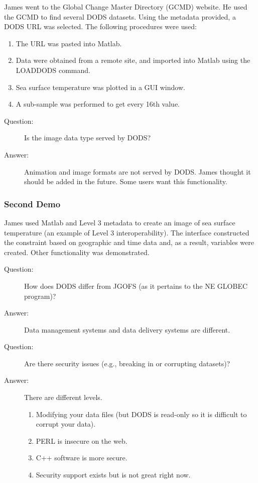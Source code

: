 James went to the Global Change Master Directory (GCMD) website.  He used the 
GCMD to find several DODS datasets.  Using the metadata provided, a DODS URL was 
selected.  The following procedures were used:

\begin{enumerate}
\item The URL was pasted into Matlab.
\item Data were obtained from a remote site, and imported into Matlab
  using the LOADDODS command.
\item Sea surface temperature was plotted in a GUI window.
\item A sub-sample was performed to get every 16th value.
\end{enumerate}

\begin{description}
\item[Question:]  Is the image data type served by DODS?
\item[Answer:] Animation and image formats are not served by DODS.
  James thought it should be added in the future.  Some users want
  this functionality.
\end{description}

\subsubsection{Second Demo}

James used Matlab and Level 3 metadata to create an image of sea
surface temperature (an example of Level 3 interoperability).  The
interface constructed the constraint based on geographic and time data
and, as a result, variables were created.  Other functionality was
demonstrated.

\begin{description}
\item[Question:] How does DODS differ from JGOFS (as it pertains to
  the NE GLOBEC program)?
\item[Answer:] Data management systems and data delivery systems are
  different.
  
\item[Question:] Are there security issues (e.g., breaking in or
  corrupting datasets)?
\item[Answer:] There are different levels.
\begin{enumerate}
\item Modifying your data files (but DODS is read-only so it is
  difficult to corrupt your data).
\item PERL is insecure on the web.
\item C++ software is more secure.
\item Security support exists but is not great right now.
\end{enumerate}
\end{description}

